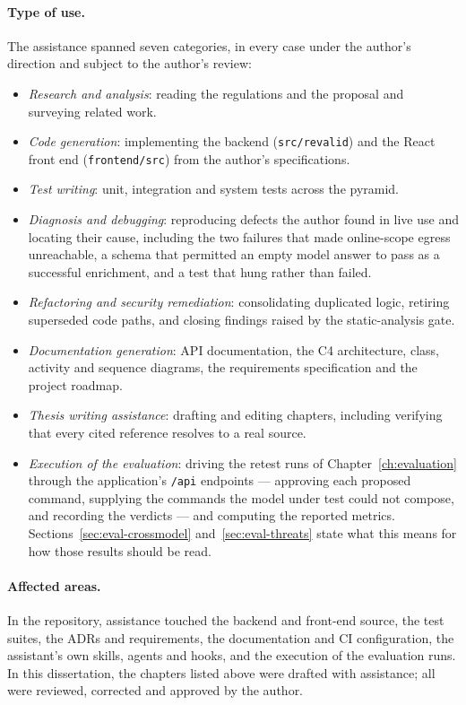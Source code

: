 \paragraph{Type of use.} The assistance spanned seven categories, in every case under
the author's direction and subject to the author's review:
\begin{itemize}
\item \emph{Research and analysis}: reading the regulations and the proposal and
  surveying related work.
\item \emph{Code generation}: implementing the backend (\texttt{src/revalid}) and
  the React front end (\texttt{frontend/src}) from the author's specifications.
\item \emph{Test writing}: unit, integration and system tests across the pyramid.
\item \emph{Diagnosis and debugging}: reproducing defects the author found in live
  use and locating their cause, including the two failures that made online-scope
  egress unreachable, a schema that permitted an empty model answer to pass as a
  successful enrichment, and a test that hung rather than failed.
\item \emph{Refactoring and security remediation}: consolidating duplicated logic,
  retiring superseded code paths, and closing findings raised by the static-analysis
  gate.
\item \emph{Documentation generation}: API documentation, the C4 architecture,
  class, activity and sequence diagrams, the requirements specification and the
  project roadmap.
\item \emph{Thesis writing assistance}: drafting and editing chapters, including
  verifying that every cited reference resolves to a real source.
\item \emph{Execution of the evaluation}: driving the retest runs of
  Chapter~\ref{ch:evaluation} through the application's \texttt{/api} endpoints ---
  approving each proposed command, supplying the commands the model under test could
  not compose, and recording the verdicts --- and computing the reported metrics.
  Sections~\ref{sec:eval-crossmodel} and~\ref{sec:eval-threats} state what this means
  for how those results should be read.
\end{itemize}

\paragraph{Affected areas.} In the repository, assistance touched the backend and
front-end source, the test suites, the ADRs and requirements, the documentation and
CI configuration, the assistant's own skills, agents and hooks, and the execution of
the evaluation runs. In this
dissertation, the chapters listed above were drafted with assistance; all were
reviewed, corrected and approved by the author.

